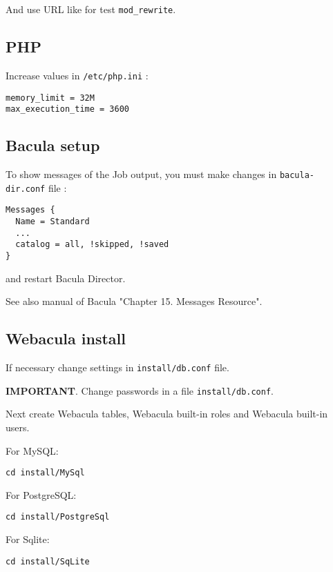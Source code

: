 \documentclass[10pt]{article}
\begin{document}
And use URL like
for test \texttt{mod\_rewrite}.


\subsection{PHP}
\label{Install:PHP}

Increase values in \texttt{/etc/php.ini} :
\begin{verbatim}
memory_limit = 32M
max_execution_time = 3600
\end{verbatim}



\subsection{Bacula setup}
\label{Install:Bacula setup}

To show messages of the Job output, you must make changes in \texttt{bacula-dir.conf} file :
\begin{verbatim}
Messages {
  Name = Standard
  ...
  catalog = all, !skipped, !saved
}
\end{verbatim}
and restart Bacula Director.

See also manual of Bacula "Chapter 15. Messages Resource".



\subsection{Webacula install}
\label{Install:Webacula install}

If necessary change settings in \texttt{install/db.conf} file.

\textbf{IMPORTANT}. Change passwords in a file \texttt{install/db.conf}.

Next create Webacula tables, Webacula built-in roles and Webacula built-in users.

For MySQL:
\begin{verbatim}
cd install/MySql
\end{verbatim}

For PostgreSQL:
\begin{verbatim}
cd install/PostgreSql
\end{verbatim}

For Sqlite:
\begin{verbatim}
cd install/SqLite
\end{verbatim}
\end{document}
